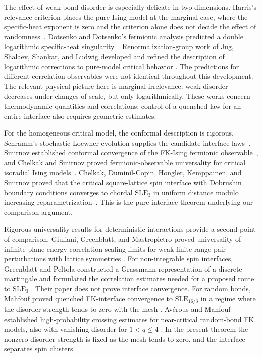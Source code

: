 The effect of weak bond disorder is especially delicate in two dimensions.
Harris's relevance criterion places the pure Ising model at the marginal
case, where the specific-heat exponent is zero and the criterion alone
does not decide the effect of randomness~\cite{Harris}.
Dotsenko and Dotsenko's fermionic analysis predicted a double logarithmic
specific-heat singularity~\cite{DD,DDReview}. Renormalization-group work
of Jug, Shalaev, Shankar, and Ludwig developed and refined the description
of logarithmic corrections to pure-model critical behavior
\cite{Jug,Shalaev,Shankar,Ludwig}. The predictions for different correlation
observables were not identical throughout this development. The relevant
physical picture here is marginal irrelevance: weak disorder decreases
under changes of scale, but only logarithmically. These works concern
thermodynamic quantities and correlations; control of a quenched law for
an entire interface also requires geometric estimates.

For the homogeneous critical model, the conformal description is
rigorous. Schramm's stochastic Loewner evolution supplies the candidate
interface laws~\cite{Schramm}. Smirnov established conformal convergence
of the FK-Ising fermionic observable~\cite{Smirnov}, and Chelkak and
Smirnov proved fermionic-observable universality for critical isoradial
Ising models~\cite{ChelkakSmirnov}. Chelkak, Duminil-Copin, Hongler,
Kemppainen, and Smirnov proved that the critical square-lattice spin
interface with Dobrushin boundary conditions converges to chordal
$\mathrm{SLE}_3$ in uniform distance modulo increasing
reparametrization~\cite[Theorem~1 and Equation~(1)]{CDHKS}.
This is the pure interface theorem underlying our comparison argument.

Rigorous universality results for deterministic interactions provide a
second point of comparison. Giuliani, Greenblatt, and Mastropietro proved
universality of infinite-plane energy-correlation scaling limits for
weak finite-range pair perturbations with lattice symmetries
\cite[Theorems~1.1--1.2]{GGM}. For non-integrable spin interfaces,
Greenblatt and Peltola constructed a Grassmann representation of a
discrete martingale and formulated the correlation estimates needed for
a proposed route to $\mathrm{SLE}_3$
\cite[Theorem~4.4 and Conjecture~4.5]{GP}. Their paper does not prove
interface convergence. For random bonds, Mahfouf proved quenched
FK-interface convergence to $\mathrm{SLE}_{16/3}$ in a regime where the
disorder strength tends to zero with the mesh
\cite[Theorem~1.6]{Mahfouf}. Av\'erous and Mahfouf established
high-probability crossing estimates for near-critical random-bond
FK models, also with vanishing disorder for $1<q\le4$
\cite[Theorems~1.5--1.6]{AM}. In the present theorem the nonzero disorder
strength is fixed as the mesh tends to zero, and the interface separates
spin clusters.

